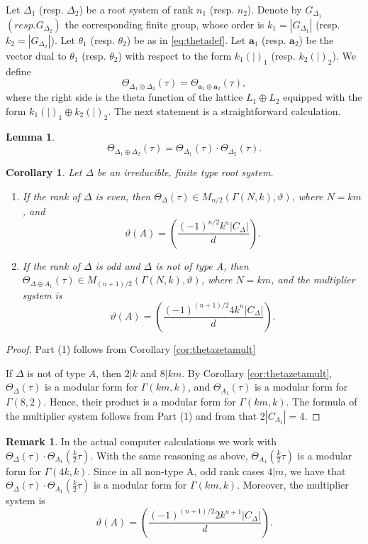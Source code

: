 \documentclass[11pt,a4paper]{amsart}
\newtheorem{lemma}[theorem]{Lemma}
\newtheorem{corollary}[theorem]{Corollary}
\theoremstyle{definition}
\newtheorem{remark}[theorem]{Remark}
\begin{document}
 
 Let $\Delta_1$ (resp. $\Delta_2$) be a root system of rank $n_1$ (resp. $n_2$). Denote by $G_{\Delta_1}$ $(resp. G_{\Delta_2})$ the corresponding finite group, whose order is $k_1=|G_{\Delta_1}|$ (resp. $k_2=|G_{\Delta_2}|$). Let 
$\theta_1$ (resp. $\theta_2$) be as in \eqref{eq:thetadef}.
 Let
 $\mathbf{a}_1$ (resp.  $\mathbf{a}_2$) be the vector dual to $\theta_1$ (resp. $\theta_2$) with respect to the form
 $k_1(|)_1$ (resp. $k_2(|)_2$). We define
 \[ \Theta_{\Delta_1 \oplus \Delta_2}(\tau)=\Theta_{\mathbf{a}_1 \oplus \mathbf{a}_2}(\tau),\]
where the right side is the theta function of the lattice $L_1 \oplus L_2$ equipped with the form $k_1(|)_1 \oplus k_2(|)_2$. The next statement is a straightforward calculation.

\begin{lemma}
\[ \Theta_{\Delta_1 \oplus \Delta_2}(\tau)=\Theta_{\Delta_1}(\tau)\cdot \Theta_{\Delta_2}(\tau).\]
\end{lemma}
 
\begin{corollary} Let $\Delta$ be an irreducible, finite type root system.
\begin{enumerate}
	\item If the rank of $\Delta$ is even, then $\Theta_{\Delta}(\tau) \in M_{n/2}(\Gamma(N,k), \vartheta)$, where $N=km$, and 
	\[ \vartheta(A)= \left( \frac{(-1)^{n/2} k^n |C_{\Delta}|}{d} \right). \]
	\item If the rank of $\Delta$ is odd and $\Delta$ is not of type A, then $\Theta_{\Delta\oplus A_1}(\tau) \in M_{(n+1)/2}(\Gamma(N,k), \vartheta)$, where $N=km$, and 
	the multiplier system is
	\[ \vartheta(A)= \left( \frac{(-1)^{(n+1)/2} 4k^n|C_{\Delta}|}{d} \right). \]
	\end{enumerate}
\end{corollary}
\begin{proof} Part (1) follows from Corollary \ref{cor:thetazetamult} 
	
	If $\Delta$ is not of type $A$, then $2|k$ and $8|km$. By Corollary \ref{cor:thetazetamult}, $\Theta_{\Delta}(\tau) $ is a modular form for $\Gamma(km,k)$, and  $\Theta_{A_1}(\tau)$ is a modular form for $\Gamma(8,2)$. Hence, their product is a modular form for $\Gamma(km,k)$. The formula of the multiplier system follows from Part (1) and from that $2|C_{A_1}|=4$.
\end{proof}

\begin{remark}
In the actual computer calculations we work with $\Theta_{\Delta}(\tau)\cdot \Theta_{A_1}(\frac{k}{2}\tau)$. With the same reasoning as above, $\Theta_{A_1}(\frac{k}{2}\tau)$ is a modular form for $\Gamma(4k,k)$. Since in all non-type A, odd rank cases $4|m$, we have that $\Theta_{\Delta}(\tau)\cdot \Theta_{A_1}(\frac{k}{2}\tau)$ is a modular form for $\Gamma(km,k)$. Moreover, the multiplier system is
\[ \vartheta(A)= \left( \frac{(-1)^{(n+1)/2} 2k^{n+1}|C_{\Delta}|}{d} \right). \]
\end{remark}
\end{document}
